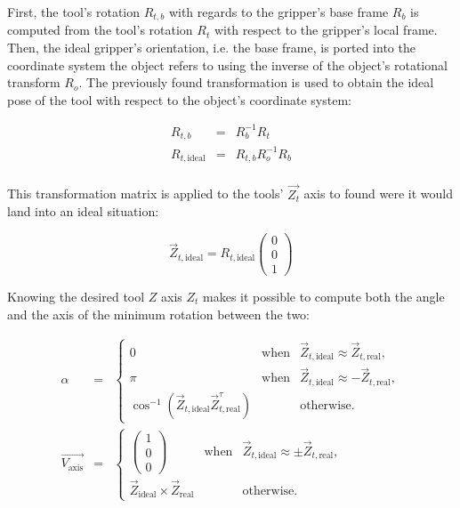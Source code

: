 First, the tool's rotation $R_{t,b}$ with regards to the gripper's
base frame $R_b$
is computed from the tool's rotation $R_t$ with respect to the
gripper's local frame.
Then, the ideal gripper's orientation, i.e. the base frame,  is ported
into the coordinate system the object refers to using the inverse of
the object's rotational transform $R_o$.
The previously found transformation is used to obtain the ideal pose of the
tool with respect to the object's coordinate system:

\begin{eqnarray}
  R_{t,b} &=& R_b^{-1} R_t\\
  R_{t,\text{ideal}} &=& R_{t,b} R_o^{-1} R_{b} \\
\end{eqnarray}

This transformation matrix is applied to the tools' $\vec{Z_t}$ axis to found
were it would land into an ideal situation:

\begin{equation}
  \vec{Z}_{t,\text{ideal}}  = R_{t,\text{ideal}}\begin{pmatrix}0\\0\\1
  \end{pmatrix}
\end{equation}

Knowing the desired tool $Z$ axis $Z_t$ makes it possible to compute
both the angle and the axis of the minimum rotation between the two:

\begin{eqnarray}
  \alpha &=& \left\{
  \begin{array}{lcr}
    0 & \text{when} & \vec{Z}_{t,\text{ideal}} \approx
    \vec{Z}_{t,\text{real}} ,\\
    \pi & \text{when} & \vec{Z}_{t,\text{ideal}} \approx
    -\vec{Z}_{t,\text{real}} ,\\
    \cos^{-1}\left(
    \vec{Z}_{t,\text{ideal}}\vec{Z}_{t,\text{real}}^{\tau}  \right) &
    & \text{otherwise.}
  \end{array} \right. \\
  \vec{V_{\text{axis}}} &=& \left\{
  \begin{array}{lcr}
    \begin{pmatrix}
      1\\0\\0
    \end{pmatrix} & \text{when} & \vec{Z}_{t,\text{ideal}} \approx
    \pm \vec{Z}_{t,\text{real}}, \\
    \vec{Z}_{\text{ideal}} \times \vec{Z}_{\text{real}} &
    & \text{otherwise.} 
  \end{array}\right.
\end{eqnarray}

